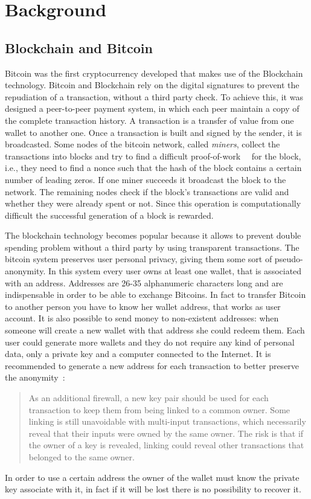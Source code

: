 \section{Background}
\subsection{Blockchain and Bitcoin}
Bitcoin was the first cryptocurrency developed that makes use of the
Blockchain technology. Bitcoin and Blockchain rely on the digital
signatures to prevent the repudiation of a transaction, without a third
party check.
To achieve this, it was designed a peer-to-peer payment system,
in which each peer maintain a copy of the complete transaction history.
A transaction is a transfer of value from one wallet to another one.
Once a transaction is built and signed by the sender, it is broadcasted.
Some nodes of the bitcoin network, called \textit{miners}, collect the
transactions into blocks and try to find a difficult
proof-of-work~\cite{pricing}~\cite{hashcash} for the
block, i.e., they need to find a nonce such that the hash of the block
contains a certain number of leading zeros.
If one miner succeeds it broadcast the block to the network.
The remaining nodes check if the block's transactions are valid and
whether they were already spent or not.
Since this operation is computationally difficult the successful
generation of a block is rewarded.

The blockchain technology becomes popular because it allows
to prevent double spending problem without a third party by using
transparent transactions.
The bitcoin system preserves user personal privacy, giving them some
sort of pseudo-anonymity.
In this system every user owns at least one wallet, that is associated
with an address. Addresses are 26-35 alphanumeric characters long and
are indispensable in order to be able to exchange Bitcoins.
In fact to transfer Bitcoin to another person you have to know her
wallet address, that works as user account.
It is also possible to send money to non-existent addresses: when
someone will create a new wallet with that address she could redeem
them.
Each user could generate more wallets and they do not require any kind
of personal data, only a private key and a computer connected to the Internet.
It is recommended to generate a new address for each transaction
to better preserve the anonymity~\cite{satoshi}:
\begin{quotation}
	As an additional firewall, a new key pair should be used for each
	transaction to keep them from being linked to a common owner.
	Some linking is still unavoidable with multi-input transactions, which
	necessarily reveal that their inputs were owned by the same owner. 
	The risk is that if the owner of a key is revealed, linking could reveal
	other transactions that belonged to
	the same owner.
\end{quotation}
In order to use a certain address the owner of the wallet must know
the private key associate with it, in fact if it
will be lost there is no possibility to recover it.


